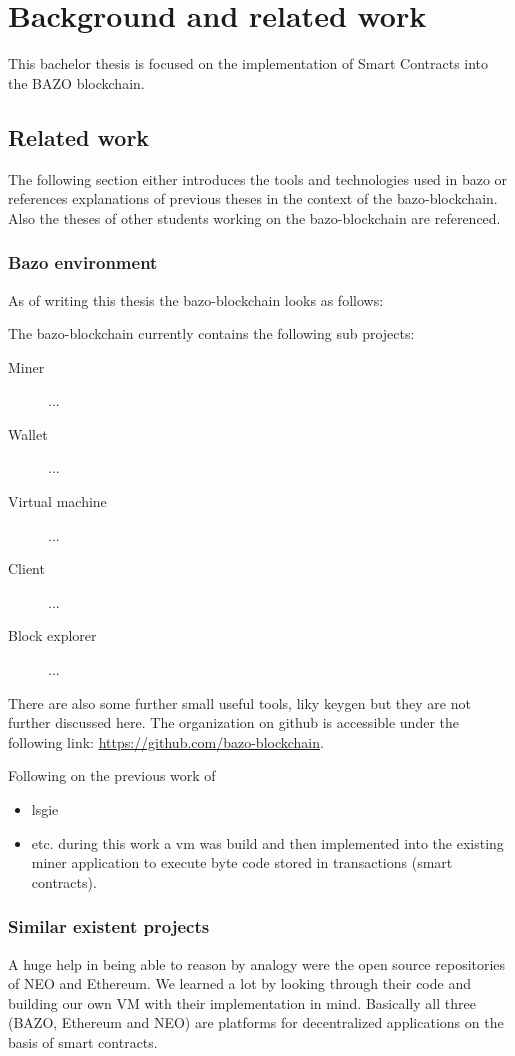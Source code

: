 \chapter{Background and related work}
\thispagestyle{main} %
This bachelor thesis is focused on the implementation of Smart Contracts into the BAZO blockchain.
\section{Related work}
The following section either introduces the tools and technologies used in bazo or references explanations of previous theses in the context of the bazo-blockchain. Also the theses of other students working on the bazo-blockchain are referenced.

\subsection{Bazo environment}
As of writing this thesis the bazo-blockchain looks as follows:

The bazo-blockchain currently contains the following sub projects:
\begin{description}
  \item[Miner] ...
  \item[Wallet] ...
  \item[Virtual machine] ...
  \item[Client] ...
  \item[Block explorer] ...
\end{description}

There are also some further small useful tools, liky keygen but they are not further discussed here. The organization on github is accessible under the following link: \href{https://github.com/bazo-blockchain}{https://github.com/bazo-blockchain}.

Following on the previous work of 
\begin{itemize}
	\item lsgie
	\item etc. during this work a vm was build and then implemented into the existing miner application to execute byte code stored in transactions (smart contracts).
\end{itemize}

\subsection{Similar existent projects}
A huge help in being able to reason by analogy were the open source repositories of NEO and Ethereum. We learned a lot by looking through their code and building our own VM with their implementation in mind. Basically all three (BAZO, Ethereum and NEO) are platforms for decentralized applications on the basis of smart contracts. 

